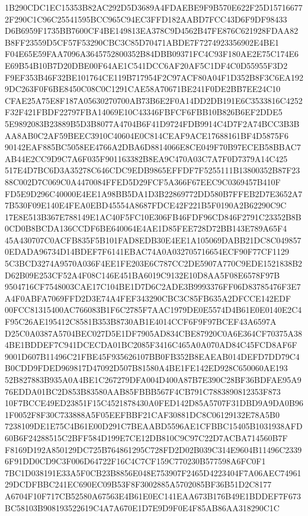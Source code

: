 \documentclass[UTF8,fontset=fandol,zihao=-4,a4paper]{ctexart}
\begin{document}
{{1B290CDC1EC15353B82AC292D5D3689A4FDAEBE9F9B570E622F25D157166772F290C1C96C25541595BCC965C94EC3FFD182AABD7FCC43D6F9DF98433
D6B6959F1735BB7600CF4BE149813EA378C9D4562B47FE876C621928FDAA82B8FF23559D5CF57F53290CBC3C85D70471ABDE7F7274923356902E4BE1
F04E65E59FAA7096A3645752800352B84DBB09371FC4C93F180AE2E75C174E6E69B54B10B7D20DBE00F64AE1C541DCC6AF20AF5C1DF4C0D55955F3D2
F9EF353B46F32BE101764CE119B717954F2C97ACF80A04F1D352B8F3C6EA1929DC263F0F6BE8450C08C0C1291CAE58A70671BE241F0DE2BB7EE24C10
CFAE25A75E8F187A05630270700AB73B6E2F0A14DD2DB191E6C3533816C4252F32F421FBDF22797FBA14069E10C43346FBFCF6FBB10B826B6EF2DDE5
5E9892083B23889B5D3B8077A4704B6F41D9724FDB9914C4D7F2A74BCC3B3BAA8AB0C2AF59BEEC3910C40604E0C814CEAF9ACE17688161BF4D5875F6
90142EAF885BC5058EE4766A2DBA6D8814066E8CE049F70B97ECEB58BBAC7AB44E2CC9D9C7A6F035F901163382B8EA9C470A03C7A7F0D7379A14C425
517E4D7BC6D3A35278C646CDC9EDB9865EFFDF7F5255111B13800352B87F2388C002D7C069C0A4470084FFED5D29FCF5A366F67EEC9C0369457B410F
FD5E9D296C40000E4EE1A98BB5DA1D3B22869772DD580B7FFEB2D7E3652A77B530F09E140E4FEA0EBD45554A8687FDCE42F221B5F0190A2B62290C9C
17E8E513B367E788149E1AC40F5FC10E306FB46FDF96CD846F2791C23352B8B0CD0B8BCDA136CCDF6BE640064E4AE1D85FEE728D72BB143E789A65F4
45A430707C0ACFB835F5B101FAD8EDB30E4EE1A105069DABB21DC8C0498570EDADA96734D14BDEF7F6141EBAC74A0A032705716654ECF90F77CF1129
5C3BCD3274A9570A036F4EE1FE203E6C787CC2DE5907A770C9EDE1521838B2D62B09E253CF52A4F08C146E451BA6019C9132E10D8AA5F08E6578F97B
9504716CF7548003CAE17C104BE1D7D6C2ADE3B9993376FF06D83785476F3E7A4F0ABFA7069FFD2D3E74A4FEF343290CBC3C85FB635A2DFCCE142EDF
00FCC81315400AC766083B1F6C2785F7AAC1979DE0E5574D4B61E0E0140E2C4F95C26AE195412C8581B353B8730AB1E4014CCF6F9F97BCEF43A6597A
D25C0A0387A5704BEC027D5E1DF7905AD834CBE87920C0A6E364CF70375A384BE1BDDEF7C941DCECDA01BC2085F3416C465A0A070AD84C45FCD8AF6F
9001D607B11496C21FBE45F935626107BB0FB352B8EAEAB014DEFD7DD79C4B0CDD9FDED969817D47092D507B81580A4BE1FE142ED928C650060AE193
52B827883B935A0A4BE1C267279DFA004D400A87B7E390C28BF36BDFAE95A976EDDA01BC2D853B83580AAB85FBBB567F4CB791C7883890812353F873
10F7BCCE49ED23851F15C4521878430A0FED142D85A5707F31DBD9A9DA0B961F0052F8F30C733888A5F05EEFBBF21CAF30881DC8C06129132E78A5B0
7238109DE1E75C4B61E00D291C7BEAABD5596AE1CFBBC15405B1031938AFD60B6F24288515C2BFF584D199E7CE12DB810C9C97C22D7ACBA714560B7F
F8169D192A850129DC725B764861295C728FD2D02B039C314E9604B11496C23396F91DD0CD9C3F006D64722F16C4C7CF159C770230B577598A6FC0F1
7BC1D038191E33A5F0CB23B8856E048E753907F2465D4223404F7A06AEC7496129DCDFBBC241EC690EC09B53F8F3002885A5702085BF36B51D2C8177
A6704F10F717CB52580A67563E4B61E0EC141EAA673B176B49E1BDDEF7F673BC58103B908193522619C4A7A670E1D7E9D9F0E4F85AB86AA318290C1C
}}
\end{document}
